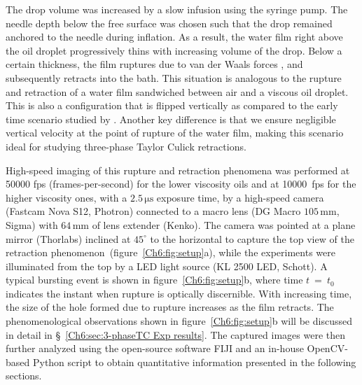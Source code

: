 The drop volume was increased by a slow infusion using the syringe pump. The needle depth below the free surface was chosen such that the drop remained anchored to the needle during inflation. As a result, the water film right above the oil droplet progressively thins with increasing volume of the drop. Below a certain thickness, the film ruptures due to van der Waals forces \citep{vaynblat-2001-pof}, and subsequently retracts into the bath. This situation is analogous to the rupture and retraction of a water film sandwiched between air and a viscous oil droplet. This is also a configuration that is flipped vertically as compared to the early time scenario studied by \citet{feng_muradoglu_kim_ault_stone_2016}. Another key difference is that we ensure negligible vertical velocity at the point of rupture of the water film, making this scenario ideal for studying three-phase Taylor Culick retractions.

High-speed imaging of this rupture and retraction phenomena was performed at 50000 fps (frames-per-second) for the lower viscosity oils and at 10000~fps for the higher viscosity ones, with a $2.5\,\si{\micro\second}$ exposure time, by a high-speed camera (Fastcam Nova S12, Photron) connected to a macro lens (DG Macro $105\,\si{\milli\meter}$, Sigma) with $64\,\si{\milli\meter}$ of lens extender (Kenko). The camera was pointed at a plane mirror (Thorlabs) inclined at $45^{\circ}$ to the horizontal to capture the top view of the retraction phenomenon~(figure~\ref{Ch6:fig:setup}a), while the experiments were illuminated from the top by a LED light source (KL 2500 LED, Schott). A typical bursting event is shown in figure~\ref{Ch6:fig:setup}b, where time $t$~=~$t_{0}$ indicates the instant when rupture is optically discernible. With increasing time, the size of the hole formed due to rupture increases as the film retracts. The phenomenological observations shown in figure~\ref{Ch6:fig:setup}b will be discussed in detail in \S~\ref{Ch6:sec:3-phaseTC Exp results}. The captured images were then further analyzed using the open-source software FIJI \citep{fiji} and an in-house OpenCV-based Python script to obtain quantitative information presented in the following sections.

